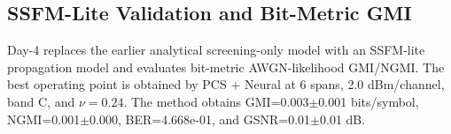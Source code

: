\subsection{SSFM-Lite Validation and Bit-Metric GMI}
Day-4 replaces the earlier analytical screening-only model with an SSFM-lite propagation model and evaluates bit-metric AWGN-likelihood GMI/NGMI. The best operating point is obtained by PCS + Neural at 6 spans, 2.0 dBm/channel, band C, and $\nu=0.24$. The method obtains GMI=0.003$\pm$0.001 bits/symbol, NGMI=0.001$\pm$0.000, BER=4.668e-01, and GSNR=0.01$\pm$0.01 dB.
